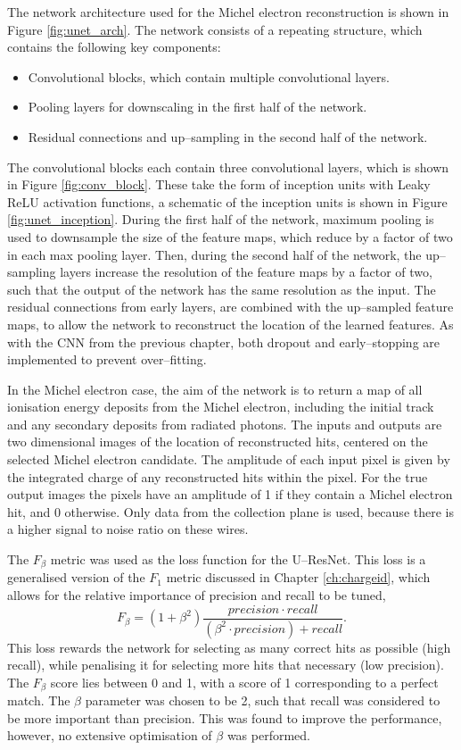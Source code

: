 The network architecture used for the Michel electron reconstruction is shown in
Figure \ref{fig:unet_arch}. The network consists of a repeating structure, which
contains the following key components:
\begin{itemize}
	\item Convolutional blocks, which contain multiple convolutional layers.
	\item Pooling layers for downscaling in the first half of the network.
	\item Residual connections and up--sampling in the second half of the network.
\end{itemize}
The convolutional blocks each contain three convolutional layers, which is
shown in Figure \ref{fig:conv_block}. These take the form of inception
units\cite{Szegedy2015} with Leaky ReLU activation functions, a schematic of
the inception units is shown in Figure \ref{fig:unet_inception}. During the
first half of the network, maximum pooling is used to downsample the size of
the feature maps, which reduce by a factor of two in each max pooling layer.
Then, during the second half of the network, the up--sampling layers increase
the resolution of the feature maps by a factor of two, such that the output of
the network has the same resolution as the input.  The residual connections
from early layers, are combined with the up--sampled feature maps, to allow
the network to reconstruct the location of the learned features. As with the
CNN from the previous chapter, both dropout and early--stopping are
implemented to prevent over--fitting.

In the Michel electron case, the aim of the network is to return a map of all
ionisation energy deposits from the Michel electron, including the initial
track and any secondary deposits from radiated photons. The inputs and outputs
are two dimensional images of the location of reconstructed hits, centered on
the selected Michel electron candidate. The amplitude of each input pixel is
given by the integrated charge of any reconstructed hits within the pixel. For
the true output images the pixels have an amplitude of 1 if they contain a
Michel electron hit, and 0 otherwise. Only data from the collection plane is
used, because there is a higher signal to noise ratio on these wires.

The $F_\beta$ metric\cite{VanRijsbergenC.J.1975Ir} was used as the loss
function for the U--ResNet.  This loss is a generalised version of the $F_1$
metric discussed in Chapter \ref{ch:chargeid}, which allows for the relative
importance of precision and recall to be tuned,
\begin{equation*}
	F_\beta = \left( 1 + \beta^2\right) \frac{precision \cdot
	recall}{\left(\beta^2 \cdot precision\right) + recall}.
\end{equation*}
This loss rewards the network for selecting as many correct hits as possible
(high recall), while penalising it for selecting more hits that necessary (low
precision). The $F_\beta$ score lies between 0 and 1, with a score of 1
corresponding to a perfect match. The $\beta$ parameter was chosen to be 2,
such that recall was considered to be more important than precision. This was
found to improve the performance, however, no extensive optimisation of $\beta$
was performed.

